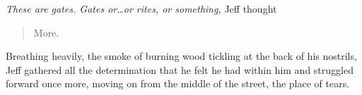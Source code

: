 \textit{These are gates.  Gates or\ldots{}or rites, or something,} Jeff thought

\begin{quote}
  More.
\end{quote}

Breathing heavily, the smoke of burning wood tickling at the back of his nostrils, Jeff gathered all the determination that he felt he had within him and struggled forward once more, moving on from the middle of the street, the place of tears.

\secdiv


